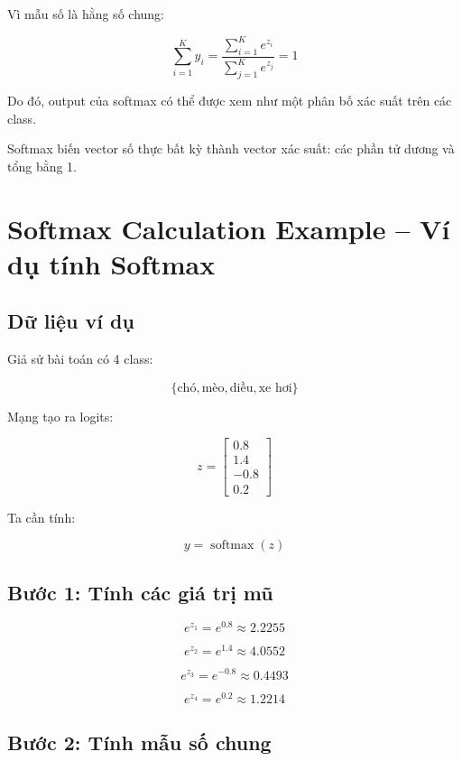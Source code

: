 Vì mẫu số là hằng số chung:

\[
    \sum_{i=1}^{K} y_i
    =
    \frac{
    \sum_{i=1}^{K} e^{z_i}
    }
    {
    \sum_{j=1}^{K} e^{z_j}
    }
    =
    1
\]

Do đó, output của softmax có thể được xem như một phân bố xác suất trên các class.

\begin{ghinho}
Softmax biến vector số thực bất kỳ thành vector xác suất: các phần tử dương và tổng bằng 1.
\end{ghinho}

\section{Softmax Calculation Example -- Ví dụ tính Softmax}

\subsection{Dữ liệu ví dụ}

Giả sử bài toán có 4 class:

\[
    \{\text{chó}, \text{mèo}, \text{diều}, \text{xe hơi}\}
\]

Mạng tạo ra logits:

\[
    z =
    \begin{bmatrix}
    0.8\\
    1.4\\
    -0.8\\
    0.2
    \end{bmatrix}
\]

Ta cần tính:

\[
    y = \operatorname{softmax}(z)
\]

\subsection{Bước 1: Tính các giá trị mũ}

\[
    e^{z_1}=e^{0.8}\approx 2.2255
\]

\[
    e^{z_2}=e^{1.4}\approx 4.0552
\]

\[
    e^{z_3}=e^{-0.8}\approx 0.4493
\]

\[
    e^{z_4}=e^{0.2}\approx 1.2214
\]

\subsection{Bước 2: Tính mẫu số chung}

